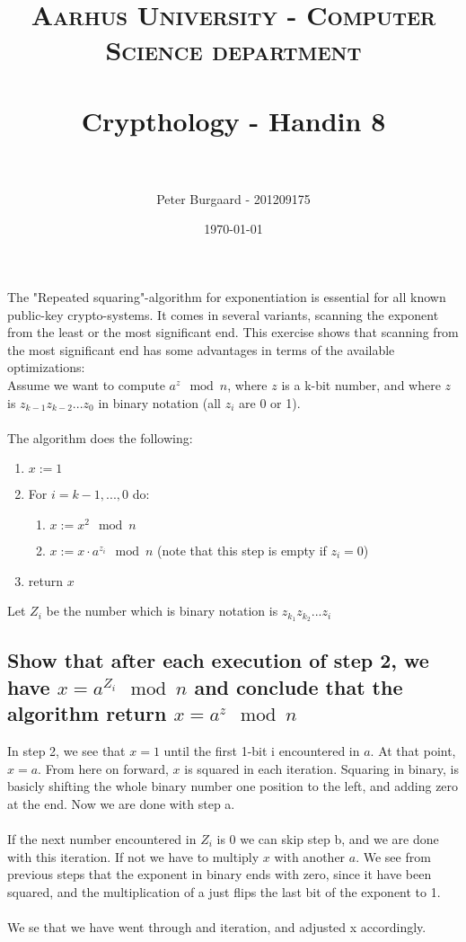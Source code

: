 \documentclass[paper=a4, fontsize=11pt]{scrartcl} %
\title{	
	\normalfont \normalsize 
	\textsc{Aarhus University - Computer Science department} \\ [25pt] %
	\horrule{0.5pt} \\[0.4cm] %
	\huge Crypthology - Handin 8 \\ %
	\horrule{2pt} \\[0.5cm] %
}
\author{Peter Burgaard - 201209175} %
\date{\normalsize\today} %
\numberwithin{equation}{section} %
\numberwithin{figure}{section} %
\numberwithin{table}{section} %
\begin{document}
	
	\maketitle %

The "Repeated squaring"-algorithm for exponentiation is essential for all known public-key crypto-systems. It comes in several variants, scanning the exponent from the least or the most significant end. This exercise shows that scanning from the most significant end has some advantages in terms of the available optimizations: \\
Assume we want to compute $a^z\mod{n}$, where $z$ is a k-bit number, and where $z$ is $z_{k-1}z_{k-2}...z_0$ in binary notation (all $z_i$ are 0 or 1). \\ \\
The algorithm does the following:
\begin{enumerate}
\item $x:=1$
\item For $i=k-1,...,0$ do:
\begin{enumerate}
\item $x:=x^2\mod{n}$
\item $x:=x\cdot a^{z_i}\mod{n}$ (note that this step is empty if $z_i=0$)
\end{enumerate}
\item return $x$
\end{enumerate}
Let $Z_i$ be the number which is binary notation is $z_{k_1}z_{k_2}...z_i$

\subsection*{Show that after each execution of step 2, we have $x=a^{Z_i}\mod{n}$ and conclude that the algorithm return $x=a^z\mod{n}$}

In step 2, we see that $x=1$ until the first 1-bit i encountered in $a$. At that point, $x=a$. From here on forward, $x$ is squared in each iteration. Squaring in binary, is basicly shifting the whole binary number one position to the left, and adding zero at the end. Now we are done with step a. \\ \\ 
If the next number encountered in $Z_i$ is 0 we can skip step b, and we are done with this iteration. If not we have to multiply $x$ with another $a$. We see from previous steps that the exponent in binary ends with zero, since it have been squared, and the multiplication of a just flips the last bit of the exponent to 1. \\ \\
We se that we have went through and iteration, and adjusted x accordingly.
\end{document}
